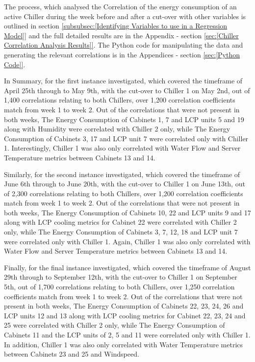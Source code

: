 \documentclass[12pt]{scrartcl}
\begin{document}
The process, which analysed the Correlation of the energy consumption of an active Chiller during the week before and after a cut-over with other variables is outlined in section \ref{subsubsec:[Identifying Variables to use in a Regression Model]} and the full detailed results are in the Appendix - section \ref{sec:[Chiller Correlation Analysis Results]}. The Python code for manipulating the data and generating the relevant correlations is in the Appendices - section \ref{sec:[Python Code]}. 

In Summary, for the first instance investigated, which covered the timeframe of April 25th through to May 9th, with the cut-over to Chiller 1 on May 2nd, out of 1,400 correlations relating to both Chillers, over 1,200 correlation coefficients match from week 1 to week 2. Out of the correlations that were not present in both weeks, The Energy Consumption of Cabinets 1, 7 and LCP units 5 and 19 along with Humidity were correlated with Chiller 2 only, while The Energy Consumption of Cabinets 3, 17 and LCP unit 7 were correlated only with Chiller 1. Interestingly, Chiller 1 was also only correlated with Water Flow and Server Temperature metrics between Cabinets 13 and 14.

Similarly, for the second instance investigated, which covered the timeframe of June 6th through to June 20th, with the cut-over to Chiller 1 on June 13th, out of 2,300 correlations relating to both Chillers, over 1,200 correlation coefficients match from week 1 to week 2. Out of the correlations that were not present in both weeks, The Energy Consumption of Cabinets 10, 22 and LCP units 9 and 17 along with LCP cooling metrics for Cabinet 22 were correlated with Chiller 2 only, while The Energy Consumption of Cabinets 3, 7, 12, 18 and LCP unit 7 were correlated only with Chiller 1. Again, Chiller 1 was also only correlated with Water Flow and Server Temperature metrics between Cabinets 13 and 14. 

Finally, for the final instance investigated, which covered the timeframe of August 29th through to September 12th, with the cut-over to Chiller 1 on September 5th, out of 1,700 correlations relating to both Chillers, over 1,250 correlation coefficients match from week 1 to week 2. Out of the correlations that were not present in both weeks, The Energy Consumption of Cabinets 22, 23, 24, 26 and LCP units 12 and 13 along with LCP cooling metrics for Cabinet 22, 23, 24 and 25 were correlated with Chiller 2 only, while The Energy Consumption of Cabinets 11 and the LCP units of 2, 5 and 11 were correlated only with Chiller 1. In addition, Chiller 1 was also only correlated with Water Temperature metrics between Cabinets 23 and 25 and Windspeed.   
\end{document}
